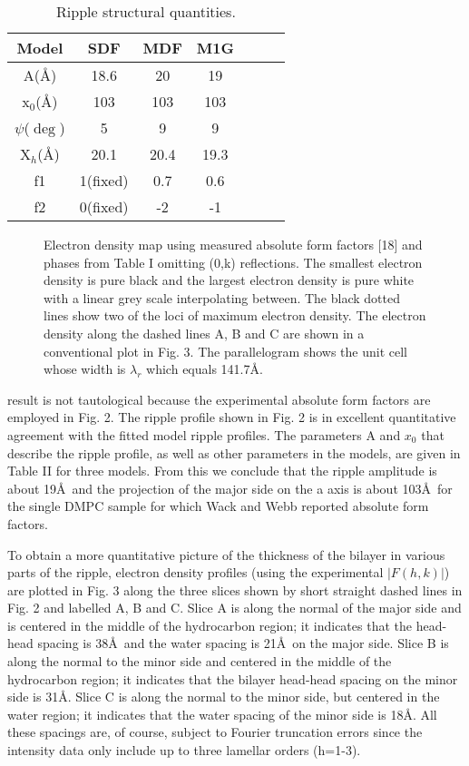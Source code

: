 \begin{table}
\caption{Ripple structural quantities.
\label{parameter}}
\vspace{6pt}
\begin{tabular}{ccccccc} 
Model & SDF & MDF & M1G \\ \hline
A(\AA) & 18.6 & 20  & 19 \\
x$_0$(\AA) & 103 & 103 & 103 \\
$\psi$($\deg$) & 5 & 9 & 9 \\
X$_h$(\AA) & 20.1 & 20.4 & 19.3 \\
f1 & 1(fixed) & 0.7 & 0.6 \\
f2 & 0(fixed) & -2 & -1 
\end{tabular}

\end{table}


\begin{figure}
\centerline {}
\vspace{11pt}
\caption{Electron density map using measured absolute form factors 
[18] and phases from Table I omitting (0,k) reflections.  The smallest 
electron density is pure black and the largest electron density is pure 
white with a linear grey scale interpolating between.  The black dotted 
lines show two of the loci of maximum electron density. The electron 
density along the dashed lines A, B and C are shown in a conventional plot 
in Fig. 3.  The parallelogram shows the unit cell whose width is $\lambda_r$ 
which equals 141.7\AA.
\label{Fig2}}
\end{figure}

\noindent 
result is not tautological because the experimental 
absolute form factors are employed in Fig. 2.
The ripple profile shown in Fig. 2 is in excellent quantitative
agreement with the fitted model ripple profiles.  The parameters
A and $x_0$ that describe the ripple profile, as well as other
parameters in the models, are given in Table II for three models.
From this we conclude that the ripple amplitude is about 19\AA\
and the projection of the major 
side on the a axis is about 103\AA\
for the single DMPC sample for which Wack and Webb \cite{Wac89a}
reported absolute form factors.

To obtain a more quantitative picture of the thickness of the
bilayer in various parts of the ripple, electron density profiles
(using the experimental $|F(h,k)|$)
are plotted in Fig. 3 along the three slices shown by short straight dashed
lines in Fig. 2 and labelled A, B and C.
Slice A is along the normal of the major side and is centered in the
middle of the hydrocarbon region; it indicates that the head-head 
spacing is 38\AA\ and the water spacing is 21\AA\ on the major side.
Slice B is along the normal to the minor side and centered
in the middle of the hydrocarbon region; it indicates that
the bilayer head-head spacing on the minor side is 31\AA.
Slice C is along the normal to the minor side, but centered in
the water region; it indicates that the water spacing of the
minor side is 18\AA.
All these spacings are, of course, subject to Fourier truncation
errors since the intensity data only include up to three lamellar orders 
(h=1-3).

